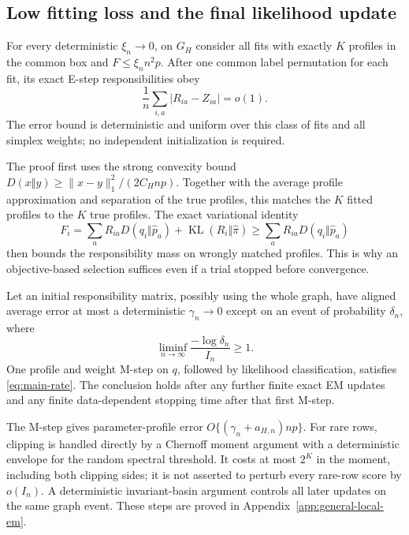 \subsection{Low fitting loss and the final likelihood update}
\begin{lemma}
\label{lem:low-loss-responsibilities}
For every deterministic $\xi_n\to0$, on $G_H$ consider all fits with exactly $K$ profiles in the common box and
$F\le\xi_n n^2p$. After one common label permutation for each fit, its exact E-step responsibilities obey
\begin{equation}
 \frac1n\sum_{i,a}|R_{ia}-Z_{ia}|=o(1).
 \label{eq:weak-responsibilities}
\end{equation}
The error bound is deterministic and uniform over this class of fits and all simplex weights; no independent initialization is required.
\end{lemma}

The proof first uses the strong convexity bound
$D(x\Vert y)\ge\|x-y\|_1^2/(2C_Hnp)$.
Together with the average profile approximation and separation of the true profiles, this matches the $K$ fitted profiles to the $K$ true profiles. The exact variational identity
\begin{equation}
 F_i=\sum_aR_{ia}D(q_i\Vert\widehat p_a)
             +\operatorname{KL}(R_i\Vert\widehat\pi)
       \ge\sum_aR_{ia}D(q_i\Vert\widehat p_a)
 \label{eq:variational-loss}
\end{equation}
then bounds the responsibility mass on wrongly matched profiles. This is why an objective-based selection suffices even if a trial stopped before convergence.

\begin{theorem}
\label{thm:local-spectral-em}
Let an initial responsibility matrix, possibly using the whole graph, have aligned average error at most a deterministic $\gamma_n\to0$ except on an event of probability $\delta_n$, where
\[
 \liminf_{n\to\infty}\frac{-\log\delta_n}{I_n}\ge1.
\]
One profile and weight M-step on $q$, followed by likelihood classification, satisfies \eqref{eq:main-rate}. The conclusion holds after any further finite exact EM updates and any finite data-dependent stopping time after that first M-step.
\end{theorem}

The M-step gives parameter-profile error $O\{(\gamma_n+a_{H,n})np\}$. For rare rows, clipping is handled directly by a Chernoff moment argument with a deterministic envelope for the random spectral threshold. It costs at most $2^K$ in the moment, including both clipping sides; it is not asserted to perturb every rare-row score by $o(I_n)$. A deterministic invariant-basin argument controls all later updates on the same graph event. These steps are proved in Appendix~\ref{app:general-local-em}.

